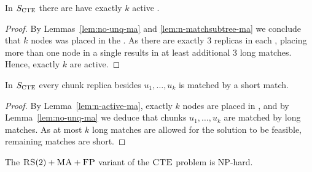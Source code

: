 \begin{lemma}
  In $S_{\mathrm{\textsc{CTE}}}$ there are have exactly $k$ active \TripleGadgets{}.
  \label{lem:n-active-ma}
\end{lemma}
\begin{proof}
  By Lemmas~\ref{lem:no-unq-ma} and \ref{lem:n-matchsubtree-ma} we conclude that $k$ nodes was placed in the \TripleGadgets.
As there are exactly $3$ replicas in each \TripleGadget{}, placing more than one node in a single \TripleGadget{} results in at least additional $3$ long matches.
Hence, exactly $k$ \TripleGadgets{} are active.
\end{proof}

\begin{lemma}
  In $S_{\mathrm{\textsc{CTE}}}$ every chunk replica besides $u_1, \ldots, u_k$ is matched by a short match.
  \label{lem:short-ma}
\end{lemma}
\begin{proof}
  By Lemma~\ref{lem:n-active-ma}, exactly $k$ nodes are placed in \TripleGadgets{}, and by Lemma~\ref{lem:no-unq-ma} we deduce that chunks $u_1, \ldots, u_k$ are matched by long matches.
  As at most $k$ long matches are allowed for the solution to be feasible, remaining matches are short.
\end{proof}

\begin{theorem}
  The $\textsc{RS}(2)+\textsc{MA}+\textsc{FP}$ variant of the $\textsc{CTE}$ problem is NP-hard.
  \label{th:ma-reduction}
\end{theorem}

